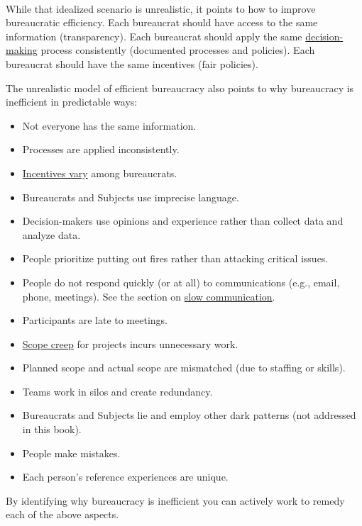 \ \\

While that idealized scenario is unrealistic, it points to how to improve bureaucratic efficiency. Each bureaucrat should have access to the same information (transparency). 
Each bureaucrat should apply the same 
\href{https://en.wikipedia.org/wiki/Decision-making}{decision-making}
process consistently (documented processes and policies).
Each bureaucrat should have the same incentives (fair policies).

The unrealistic model of efficient bureaucracy also points to why bureaucracy is inefficient in predictable ways:
\begin{itemize}
    \item Not everyone has the same information.
    \item Processes are applied inconsistently.
    \item \hyperref[sec:motivations]{Incentives vary} among bureaucrats.
    \item Bureaucrats and Subjects use imprecise language.
    \item Decision-makers use opinions and experience rather than collect data and analyze data.
    \item People prioritize putting out fires rather than attacking critical issues.
    \item People do not respond quickly (or at all) to communications (e.g., email, phone, meetings). See the section on \hyperref[sec:slowing-communication]{slow communication}.
    \item Participants are late to meetings.
    \item \hyperref[sec:scope-creep]{Scope creep} 
    for projects incurs unnecessary work.
    \item Planned scope and actual scope are mismatched  (due to staffing or skills).
    \item Teams work in silos and create redundancy.
    \item Bureaucrats and Subjects lie and employ other dark patterns (not addressed in this book).
    \item People make mistakes.
    \item Each person's reference experiences are unique.
\end{itemize}
By identifying why bureaucracy is inefficient you can actively work to remedy each of the above aspects. 

